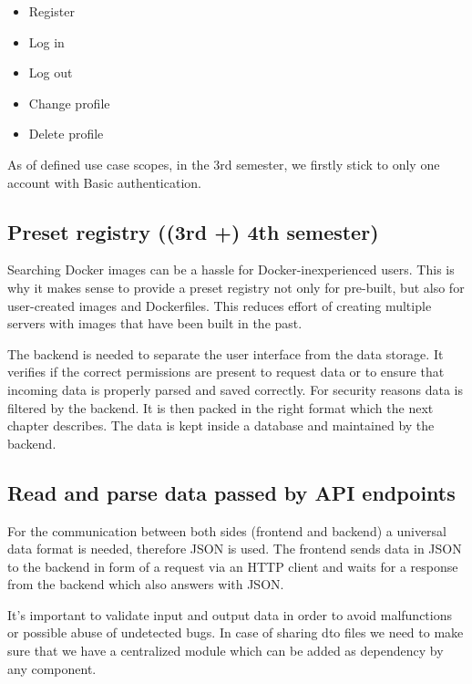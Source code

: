 \documentclass[a4paper,12pt,chapterprefix=false,bibliography=totoc,listof=totoc,]{scrreprt}
\begin{document}
\begin{itemize}
	\item Register
	\item Log in
	\item Log out
	\item Change profile
	\item Delete profile
\end{itemize}

As of defined use case scopes, in the 3rd semester, we firstly stick to only one account with Basic authentication.

\subsection{Preset registry ((3rd +) 4th semester)}
Searching Docker images can be a hassle for Docker-inexperienced users. This is why it makes sense to provide a preset registry not only for pre-built, but also for user-created images and Dockerfiles. This reduces effort of creating multiple servers with images that have been built in the past.

The backend is needed to separate the user interface from the data storage. It verifies if the correct permissions are present to request data or to ensure that incoming data is properly parsed and saved correctly. For security reasons data is filtered by the backend. It is then packed in the right format which the next chapter describes. The data is kept inside a database and maintained by the backend.


\subsection{Read and parse data passed by API endpoints}
For the communication between both sides (frontend and backend) a universal data format is needed, therefore JSON is used. The frontend sends data in JSON to the backend in form of a request via an HTTP client and waits for a response from the backend which also answers with JSON.

It's important to validate input and output data in order to avoid malfunctions or possible abuse of undetected bugs. In case of sharing \gls{dto} files we need to make sure that we have a centralized module which can be added as dependency by any component.
\end{document}
